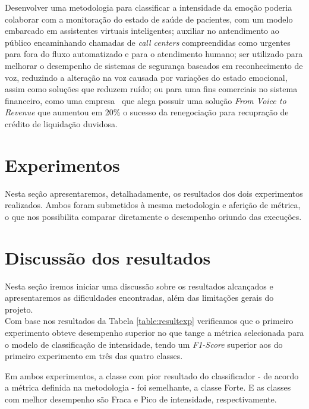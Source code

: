 Desenvolver uma metodologia para classificar a intensidade da emoção poderia colaborar com a monitoração do estado de saúde de pacientes, com um modelo embarcado em assistentes virtuais inteligentes; auxiliar no antendimento ao público encaminhando chamadas de \textit{call centers} compreendidas como urgentes para fora do fluxo automatizado e para o atendimento humano; ser utilizado para melhorar o desempenho de sistemas de segurança baseados em reconhecimento de voz, reduzindo a alteração na voz causada por variações do estado emocional, assim como soluções que reduzem ruído; ou para uma fins comerciais no sistema financeiro, como uma empresa~\cite{bsignal0} que alega possuir uma solução \textit{From Voice to Revenue} que aumentou em 20\% o sucesso da renegociação para recupração de crédito de liquidação duvidosa.


\section{Experimentos}

Nesta seção apresentaremos, detalhadamente, os resultados dos dois experimentos realizados. Ambos foram submetidos à mesma metodologia e aferição de métrica, o que nos possibilita comparar diretamente o desempenho oriundo das execuções.\\




\clearpage

\section{Discussão dos resultados}

Nesta seção iremos iniciar uma discussão sobre os resultados alcançados e apresentaremos as dificuldades encontradas, além das limitações gerais do projeto.\\

Com base nos resultados da Tabela \ref{table:resultexp} verificamos que o primeiro experimento obteve desempenho superior no que tange a métrica selecionada para o modelo de classificação de intensidade, tendo um \textit{F1-Score} superior aos do primeiro experimento em três das quatro classes.

Em ambos experimentos, a classe com pior resultado do classificador - de acordo a métrica definida na metodologia - foi semelhante, a classe Forte. E as classes com melhor desempenho são Fraca e Pico de intensidade, respectivamente.

